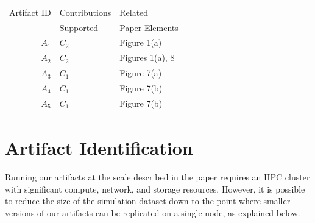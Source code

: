 \documentclass[conference]{IEEEtran}
\begin{document}


\begin{center}
    \begin{tabular}{rll}
        \toprule
        Artifact ID & Contributions & Related         \\
                    & Supported     & Paper Elements  \\
        \midrule
        $A_1$       & $C_2$         & Figure 1(a)     \\
        \midrule
        $A_2$       & $C_2$         & Figures 1(a), 8 \\
        \midrule
        $A_3$       & $C_1$         & Figure 7(a)     \\
        \midrule
        $A_4$       & $C_1$         & Figure 7(b)     \\
        \midrule
        $A_5$       & $C_1$         & Figure 7(b)     \\
        \bottomrule
    \end{tabular}
\end{center}


\section{Artifact Identification}
Running our artifacts at the scale described in the paper requires
an HPC cluster with significant compute, network, and storage resources.
However, it is possible to reduce the size of the simulation dataset
down to the point where smaller versions of our artifacts can be
replicated on a single node, as explained below.
\end{document}
